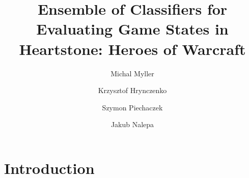 \documentclass{svproc}
\begin{document}
\title{Ensemble of Classifiers for Evaluating Game States in Heartstone: Heroes of Warcraft}
\author{Michal Myller \and Krzysztof Hrynczenko \and Szymon Piechaczek \and Jakub Nalepa}
%

\maketitle





\section{Introduction} \label{sec:Introduction}
\end{document}

